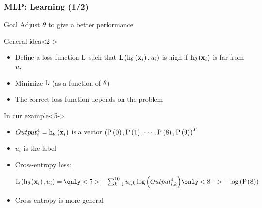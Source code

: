 \begin{frame}
  \frametitle{\acl{MLP}: Learning (1/2)}

  \begin{block}{Goal}
    Adjust $\mathbf{\theta}$ to give a better performance
  \end{block}

  \begin{block}{General idea}<2->
    \begin{itemize}
    \item<2-> Define a loss function $\mathrm{L}$ such that $\mathrm{L} \left ( {
            \mathrm{h}_{\mathbf{\theta}} \left ( {\mathbf{x}_i} \right ),
            u_i
          } \right )$ is high if $\mathrm{h}_{\mathbf{\theta}} \left ( {\mathbf{x}_i} \right )$ is far from
          $u_i$
     \item<3-> Minimize $\mathrm{L}$ (as a function of $\mathbf{\theta}$)
     \item<4-> The correct loss function depends on the problem
    \end{itemize}
  \end{block}

  \begin{block}{In our example}<5->
    \begin{itemize}
    \def\vectorextleftdelim{(}
    \def\vectorextrightdelim{)}
    \item $Output_i^4 = \mathrm{h}_{\mathbf{\theta}} \left ( {\mathbf{x}_i} \right )$ is a vector $\vectorext{\prob{0}, \prob{1}, \cdots,
        \prob{8}, \prob{9}}^T$
    \item $u_i$ is the label 
  \item<7-> Cross-entropy loss:
    \begin{center}
      $
        \apply{\lossFunc}{\apply{\hyp_\params}{\example_i},
          \knownLabel_i} = \only<7>{- \sum_{k=1}^{10} \knownLabel_{i,k}
          \apply{\log}{\output_{i,k}^4}}
                           \only<8->{- \apply{\log}{\prob{8}}}
      $
    \end{center}
    \item<9-> Cross-entropy is more general
    \end{itemize}
  \end{block}
\end{frame}


